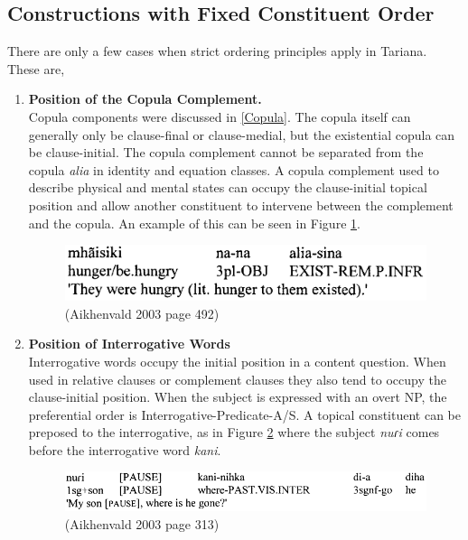 \documentclass{article}
\begin{document}
\subsection{Constructions with Fixed Constituent Order}
There are only a few cases when strict ordering principles apply in Tariana. These are, %

\begin{enumerate}
  \item \textbf{Position of the Copula Complement.}\\
  Copula components were discussed in \ref*{Copula}.
  The copula itself can generally only be clause-final or clause-medial, but the existential copula can be clause-initial. The copula complement cannot be separated from the copula \textit{alia} in identity and equation classes. A copula complement used to describe physical and mental states can occupy the clause-initial topical position and allow another constituent to intervene between the complement and the copula. An example of this can be seen in Figure \ref*{hungerexisted}.

  \begin{figure}[h!]
    \centering
    \includegraphics[scale = 0.42]{hungerexisted.png}
      \caption{(Aikhenvald 2003 page 492)}
      \label{hungerexisted}
  \end{figure}

  \item \textbf{Position of Interrogative Words} \\
  Interrogative words occupy the initial position in a content question. When used in relative clauses or complement clauses they also tend to occupy the clause-initial position. When the subject is expressed with an overt NP, the preferential order is Interrogative-Predicate-A/S. A topical constituent can be preposed to the interrogative, as in Figure \ref*{mysongone} where the subject \textit{nuɾi} comes before the interrogative word \textit{kani}.

  \begin{figure}[h!]
    \centering
    \includegraphics[scale = 0.45]{mysongone.png}
      \caption{(Aikhenvald 2003 page 313)}
      \label{mysongone}
  \end{figure}


\end{enumerate}
\end{document}

